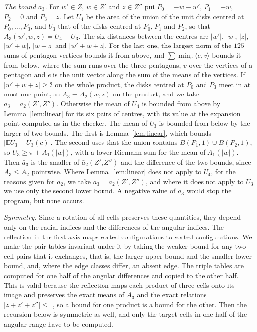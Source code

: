\documentclass[11pt]{amsart}
\theoremstyle{definition}
\theoremstyle{remark}
\numberwithin{equation}{section}
\newcommand{\E}{\mathbb{E}}
\begin{document}
\emph{The bound $\bar a_3$.} For $w'\in Z$, $w\in Z'$ and $z\in Z''$ put $P_0=-w-w'$, $P_1=-w$, $P_2=0$ and $P_3=z$. Let $U_4$ be the area of the union of the unit disks centred at $P_0,\dots,P_3$, and $U_3$ that of the disks centred at $P_0$, $P_1$ and $P_2$, so that $A_3(w',w,z)=U_4-U_3$. The six distances between the centres are $|w'|$, $|w|$, $|z|$, $|w'+w|$, $|w+z|$ and $|w'+w+z|$. For the last one, the largest norm of the $125$ sums of pentagon vertices bounds it from above, and $\sum\min_v\langle e,v\rangle$ bounds it from below, where the sum runs over the three pentagons, $v$ over the vertices of a pentagon and $e$ is the unit vector along the sum of the means of the vertices. If $|w'+w+z|\ge2$ on the whole product, the disks centred at $P_0$ and $P_3$ meet in at most one point, so $A_3=A_2(w,z)$ on the product, and we take $\bar a_3=\bar a_2(Z',Z'')$. Otherwise the mean of $U_4$ is bounded from above by Lemma~\ref{lem:linear} for its six pairs of centres, with its value at the expansion point computed as in the checker. The mean of $U_3$ is bounded from below by the larger of two bounds. The first is Lemma~\ref{lem:linear}, which bounds $|\E U_3-U_3(c)|$. The second uses that the union contains $B(P_1,1)\cup B(P_2,1)$, so $U_3\ge\pi+A_1(|w|)$, with a lower Riemann sum for the mean of $A_1(|w|)$. Then $\bar a_3$ is the smaller of $\bar a_2(Z',Z'')$ and the difference of the two bounds, since $A_3\le A_2$ pointwise. Where Lemma~\ref{lem:linear} does not apply to $U_4$, for the reasons given for $\bar a_2$, we take $\bar a_3=\bar a_2(Z',Z'')$, and where it does not apply to $U_3$ we use only the second lower bound. A negative value of $\bar a_3$ would stop the program, but none occurs.

\emph{Symmetry.} Since a rotation of all cells preserves these quantities, they depend only on the radial indices and the differences of the angular indices. The reflection in the first axis maps sorted configurations to sorted configurations. We make the pair tables invariant under it by taking the weaker bound for any two cell pairs that it exchanges, that is, the larger upper bound and the smaller lower bound, and, where the edge classes differ, an absent edge. The triple tables are computed for one half of the angular differences and copied to the other half. This is valid because the reflection maps each product of three cells onto its image and preserves the exact means of $A_3$ and the exact relations $|z+z'+z''|\le1$, so a bound for one product is a bound for the other. Then the recursion below is symmetric as well, and only the target cells in one half of the angular range have to be computed.
\end{document}
